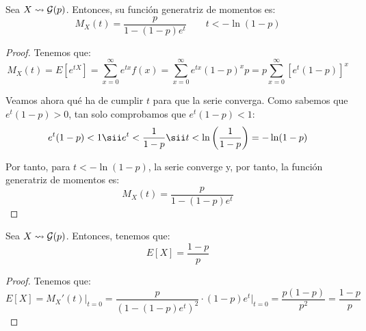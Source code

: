 \begin{prop}
    Sea $X\leadsto \mathcal{G}(p)$. Entonces, su función generatriz de momentos es:
    \begin{equation*}
        M_X(t) = \frac{p}{1-(1-p)e^t} \qquad t<-\ln(1-p)
    \end{equation*}
\end{prop}
\begin{proof}
    Tenemos que:
    \begin{equation*}
        M_X(t) = E[e^{tX}] = \sum_{x=0}^\infty e^{tx}f(x) = \sum_{x=0}^\infty e^{tx}(1-p)^{x}p = p\sum_{x=0}^\infty [e^t(1-p)]^x
    \end{equation*}

    Veamos ahora qué ha de cumplir $t$ para que la serie converga. Como
    sabemos que $e^t(1-p)>0$, tan solo comprobamos que $e^t(1-p)<1$:
    \begin{equation*}
        e^t(1-p)<1 \sii e^t<\frac{1}{1-p} \sii t<\ln\left(\frac{1}{1-p}\right) = -\ln(1-p)
    \end{equation*}

    Por tanto, para $t<-\ln(1-p)$, la serie converge y, por tanto, la función generatriz de momentos es:
    \begin{equation*}
        M_X(t) = \frac{p}{1-(1-p)e^t}
    \end{equation*}
\end{proof}


\begin{coro}
    Sea $X\leadsto \mathcal{G}(p)$. Entonces, tenemos que:
    \begin{equation*}
        E[X] = \frac{1-p}{p}
    \end{equation*}
\end{coro}
\begin{proof}
    Tenemos que:
    \begin{equation*}
        E[X] = M_X'(t)\Big|_{t=0} = \frac{p}{(1-(1-p)e^t)^2}\cdot (1-p)e^t\Big|_{t=0} = \frac{p(1-p)}{p^2} = \frac{1-p}{p}
    \end{equation*}
\end{proof}

